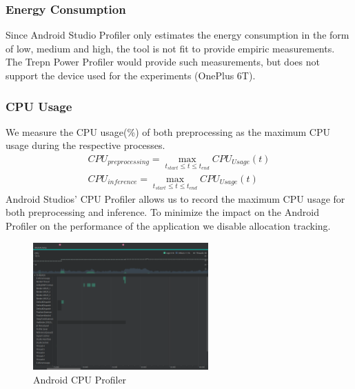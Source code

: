 \subsubsection{Energy Consumption}
Since Android Studio Profiler only estimates the energy consumption in the form of low, medium and high, the tool is not fit to provide empiric measurements. The Trepn Power Profiler would provide such measurements, but does not support the device used for the experiments (OnePlus 6T).
\subsubsection{CPU Usage}
We measure the CPU usage(\%) of both preprocessing as the maximum CPU usage during the respective processes.
\begin{equation*}
\begin{gathered}
CPU_{preprocessing} = \max\limits_{t_{start} \leq t \leq t_{end}} CPU_{Usage}(t)\\
CPU_{inference} = \max\limits_{t_{start} \leq t \leq t_{end}} CPU_{Usage}(t)
\end{gathered}
\end{equation*}
Android Studios’ CPU Profiler allows us to record the maximum CPU usage for both preprocessing and inference. To minimize the impact on the Android Profiler on the performance of the application we disable allocation tracking.
\begin{figure}[H]
\centering  
\includegraphics[width=0.6\textwidth]{./Bilder/profiler_CPU}
\caption{Android CPU Profiler}
\label{fig:prof_cpu}
\end{figure}
